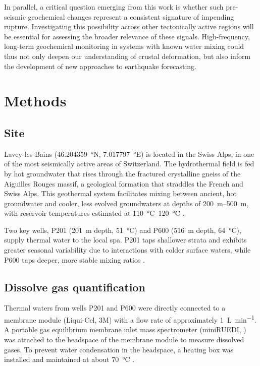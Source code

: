 In parallel, a critical question emerging from this work is whether such pre-seismic geochemical changes represent a consistent signature of impending rupture.
Investigating this possibility across other tectonically active regions will be essential for assessing the broader relevance of these signals.
High-frequency, long-term geochemical monitoring in systems with known water mixing could thus not only deepen our understanding of crustal deformation, but also inform the development of new approaches to earthquake forecasting.

\section{Methods}
\subsection{Site}
Lavey-les-Bains (\SI{46.204359}{\degree}N, \SI{7.017797}{\degree}E) is located in the Swiss Alps, in one of the most seismically active areas of Switzerland.
The hydrothermal field is fed by hot groundwater that rises through the fractured crystalline gneiss of the Aiguilles Rouges massif, a geological formation that straddles the French and Swiss Alps.
This geothermal system facilitates mixing between ancient, hot groundwater and cooler, less evolved groundwaters at depths of \SIrange{200}{500}{\meter}, with reservoir temperatures estimated at \SIrange{110}{120}{\celsius} \citep{sonney2009numerical, wanner2019quantification, giroud2025microbio}.

Two key wells, P201 (\SI{201}{\meter} depth, \SI{51}{\celsius}) and P600 (\SI{516}{\meter} depth, \SI{64}{\celsius}), supply thermal water to the local spa.
P201 taps shallower strata and exhibits greater seasonal variability due to interactions with colder surface waters, while P600 taps deeper, more stable mixing ratios \citep{sonney2009numerical, giroud2025microbio}.

\subsection{Dissolve gas quantification}
Thermal waters from wells P201 and P600 were directly connected to a membrane module (Liqui-Cel\textsuperscript{\texttrademark}, 3M\textsuperscript{\texttrademark}) with a flow rate of approximately \SI{1}{\liter\per\minute}.
A portable gas equilibrium membrane inlet mass spectrometer (miniRUEDI, \cite{brennwald2016portable}) was attached to the headspace of the membrane module to measure dissolved gases.
To prevent water condensation in the headspace, a heating box was installed and maintained at about \SI{70}{\celsius} \citep{giroud2023new}.

